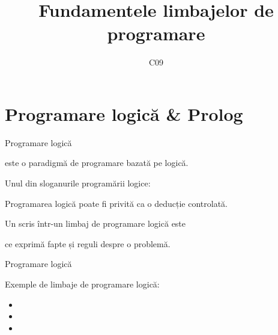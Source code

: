 \documentclass[xcolor=pdftex,romanian,colorlinks]{beamer}
\title[FLP]{Fundamentele limbajelor de programare}
\subtitle{C09}
\date{}
\begin{document}
\begin{frame}
  \titlepage
\end{frame}

\setlength{\leftmargini}{12pt}


\section{\color{section-color}Programare logică \& Prolog}

\begin{frame}{Programare logică}


 este o paradigmă de programare 
	bazată pe logică.
	
	\vspace{.2cm} 
Unul din sloganurile programării logice:
	\vspace{-.2cm}
	\begin{center}
	\href{https://www.doc.ic.ac.uk/~rak/papers/History.pdf}{}  	
	\end{center} 
	
	\vspace{.2cm}
Programarea logică poate fi privită ca o deducție controlată.	
	
	\vspace{.2cm} 
Un  scris într-un limbaj de programare logică este
	\vspace{-.2cm}
	\begin{center}
	\end{center}
		\vspace{-.2cm}
	ce exprimă fapte și reguli despre o problemă.
\end{frame}

\begin{frame}{Programare logică}

	\vspace{.2cm} 
 Exemple de limbaje de programare logică: 
		\begin{itemize}
			\item {}
			\item {}
			\item {}
		\end{itemize}

\end{frame}
\end{document}
